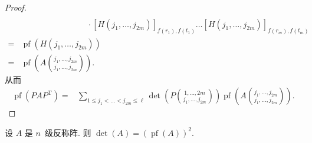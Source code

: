 \documentclass[../libro]{subfiles}
\begin{document}
\begin{proof}
\begin{align*}
        \\
             &
        \quad \quad \quad \quad \quad \quad \quad \quad
        \cdot
        [H(j_1, \dots, j_{2m})]_{f(r_1),f(t_1)}
        \dots
        [H(j_1, \dots, j_{2m})]_{f(r_m),f(t_m)}
        \\
        = {} &
        \operatorname{pf} {(H(j_1, \dots, j_{2m}))}
        \\
        = {} &
        \operatorname{pf} {\left(
            A\binom{j_1,\dots,j_{2m}}{j_1,\dots,j_{2m}}
            \right)}.
    \end{align*}
    从而
    \begin{align*}
        \operatorname{pf} {(P A P^{\mathrm{T}})}
        = {} &
        \sum_{1 \leq j_1 < \dots < j_{2m} \leq \ell}
        {\det {\left(
                P\binom{1,\dots,2m}{j_1,\dots,j_{2m}}
                \right)}
            \operatorname{pf} {\left(
                A\binom{j_1,\dots,j_{2m}}{j_1,\dots,j_{2m}}
                \right)}}.
    \end{align*}
\end{proof}

\clearpage

\begin{theorem}
    设 \(A\) 是 \(n\)~级反称阵.
    则 \(\det {(A)}
    = (\operatorname{pf} {(A)})^2\).
\end{theorem}
\end{document}
